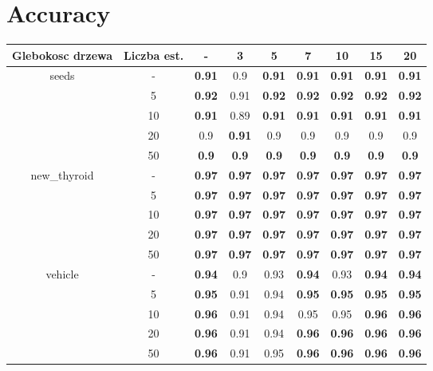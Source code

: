 \documentclass{article}%
\begin{document}
%
\normalsize%
\section*{Accuracy}%
\begin{tabular}{c|c|ccccccc}%
\hline%
Glebokosc drzewa&Liczba est.&{-}&3&5&7&10&15&20\\%
\hline%
\multirow{5}{*}{seeds}&{-}&\textbf{0.91}&0.9&\textbf{0.91}&\textbf{0.91}&\textbf{0.91}&\textbf{0.91}&\textbf{0.91}\\%
\cline{2%
-%
9}%
&5&\textbf{0.92}&0.91&\textbf{0.92}&\textbf{0.92}&\textbf{0.92}&\textbf{0.92}&\textbf{0.92}\\%
\cline{2%
-%
9}%
&10&\textbf{0.91}&0.89&\textbf{0.91}&\textbf{0.91}&\textbf{0.91}&\textbf{0.91}&\textbf{0.91}\\%
\cline{2%
-%
9}%
&20&0.9&\textbf{0.91}&0.9&0.9&0.9&0.9&0.9\\%
\cline{2%
-%
9}%
&50&\textbf{0.9}&\textbf{0.9}&\textbf{0.9}&\textbf{0.9}&\textbf{0.9}&\textbf{0.9}&\textbf{0.9}\\%
\hline%
\multirow{5}{*}{new\_thyroid}&{-}&\textbf{0.97}&\textbf{0.97}&\textbf{0.97}&\textbf{0.97}&\textbf{0.97}&\textbf{0.97}&\textbf{0.97}\\%
\cline{2%
-%
9}%
&5&\textbf{0.97}&\textbf{0.97}&\textbf{0.97}&\textbf{0.97}&\textbf{0.97}&\textbf{0.97}&\textbf{0.97}\\%
\cline{2%
-%
9}%
&10&\textbf{0.97}&\textbf{0.97}&\textbf{0.97}&\textbf{0.97}&\textbf{0.97}&\textbf{0.97}&\textbf{0.97}\\%
\cline{2%
-%
9}%
&20&\textbf{0.97}&\textbf{0.97}&\textbf{0.97}&\textbf{0.97}&\textbf{0.97}&\textbf{0.97}&\textbf{0.97}\\%
\cline{2%
-%
9}%
&50&\textbf{0.97}&\textbf{0.97}&\textbf{0.97}&\textbf{0.97}&\textbf{0.97}&\textbf{0.97}&\textbf{0.97}\\%
\hline%
\multirow{5}{*}{vehicle}&{-}&\textbf{0.94}&0.9&0.93&\textbf{0.94}&0.93&\textbf{0.94}&\textbf{0.94}\\%
\cline{2%
-%
9}%
&5&\textbf{0.95}&0.91&0.94&\textbf{0.95}&\textbf{0.95}&\textbf{0.95}&\textbf{0.95}\\%
\cline{2%
-%
9}%
&10&\textbf{0.96}&0.91&0.94&0.95&0.95&\textbf{0.96}&\textbf{0.96}\\%
\cline{2%
-%
9}%
&20&\textbf{0.96}&0.91&0.94&\textbf{0.96}&\textbf{0.96}&\textbf{0.96}&\textbf{0.96}\\%
\cline{2%
-%
9}%
&50&\textbf{0.96}&0.91&0.95&\textbf{0.96}&\textbf{0.96}&\textbf{0.96}&\textbf{0.96}\\%

\end{tabular}
\end{document}

